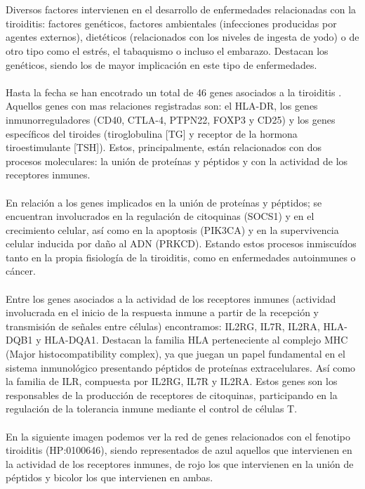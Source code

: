 \\ \\
Diversos factores  intervienen en el desarrollo de enfermedades relacionadas con la tiroiditis: factores genéticos, factores ambientales (infecciones producidas por agentes externos), dietéticos (relacionados con los niveles de ingesta de yodo) o de otro tipo como el estrés, el tabaquismo o incluso el embarazo. Destacan los genéticos, siendo los de mayor implicación en este tipo de enfermedades. \cite{Hiromatsu}
\\ \\ 
Hasta la fecha se han encotrado un total de 46 genes asociados a la tiroiditis \cite{StringHP:0100646}. Aquellos genes con mas relaciones registradas son: el HLA-DR, los genes inmunorreguladores (CD40, CTLA-4, PTPN22, FOXP3 y CD25) y los genes específicos del tiroides (tiroglobulina [TG] y receptor de la hormona tiroestimulante [TSH]).
Estos, principalmente, están relacionados con dos procesos moleculares: la unión de proteínas y péptidos y con la actividad de los receptores inmunes. \cite{Hiromatsu}
\\ \\
En relación a los genes implicados en la unión de proteínas y péptidos; se encuentran involucrados en la regulación de citoquinas (SOCS1) y en el crecimiento celular, así como en la  apoptosis (PIK3CA) y en la supervivencia celular inducida por daño al ADN (PRKCD). Estando estos procesos inmiscuídos tanto en la propia fisiología de la tiroiditis, como en enfermedades autoinmunes o cáncer.\cite{StringHP:0100646, Yamada2022, PRKCDGeneCards}
\\ \\ 
Entre los genes asociados a la actividad de los receptores inmunes (actividad involucrada en el inicio de la respuesta inmune a partir de la recepción y transmisión de señales entre células) encontramos: IL2RG, IL7R, IL2RA, HLA-DQB1 y HLA-DQA1. Destacan la familia HLA  perteneciente al complejo MHC (Major histocompatibility complex), ya que juegan un papel fundamental en el sistema inmunológico presentando péptidos de proteínas extracelulares. \cite{HLA}Así como la familia de ILR, compuesta por IL2RG, IL7R y IL2RA. Estos genes son los responsables de la producción de receptores de citoquinas, participando en la regulación de la tolerancia inmune mediante el control de células T. \cite{StringHP:0100646}
\\ \\ \newpage
En la siguiente imagen podemos ver la red de genes relacionados con el fenotipo tiroiditis (HP:0100646), siendo representados de azul aquellos que intervienen en la actividad de los receptores inmunes, de rojo los que intervienen en la unión de péptidos y bicolor los que intervienen en ambas.

